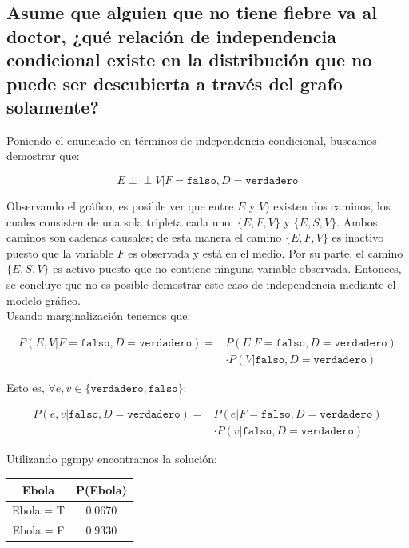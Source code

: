 \documentclass[letterpaper,12pt]{article}
\theoremstyle{definition}
\begin{document}
\subsection*{Asume que alguien que no tiene fiebre va al doctor, ¿qué relación de independencia condicional existe en la distribución que no puede ser descubierta a través del grafo solamente?}

Poniendo el enunciado en términos de independencia condicional, buscamos demostrar que:

\begin{equation}
E \perp\!\!\!\perp V | F = \texttt{falso}, D = \texttt{verdadero}
\end{equation}

Observando el gráfico, es posible ver que entre \(E\) y \(V\)) existen dos caminos, los cuales consisten de una sola tripleta cada uno: \(\{E,F,V\}\) y  \(\{E,S,V\}\). Ambos caminos son cadenas causales; de esta manera el camino \(\{E,F,V\}\) es inactivo puesto que la variable \(F\) es observada y está en el medio. Por su parte, el camino  \(\{E,S,V\}\) es activo puesto que no contiene ninguna variable observada. Entonces, se concluye que no es posible demostrar este caso de independencia mediante el modelo gráfico. \\

Usando marginalización tenemos que: 

\begin{align*}
P(E,V | F = \texttt{falso},D = \texttt{verdadero}) = & P(E|F = \texttt{falso},D = \texttt{verdadero}) \\
                             & \cdot P(V|\texttt{falso},D = \texttt{verdadero})
\end{align*}

Esto es, \(\forall e,v \in \{\texttt{verdadero},\texttt{falso}\}\):

\begin{align*}
P(e,v|\texttt{falso},D = \texttt{verdadero}) = & P(e|F = \texttt{falso},D = \texttt{verdadero}) \\
&  \cdot P(v|\texttt{falso},D = \texttt{verdadero})
\end{align*}


Utilizando pgmpy encontramos la solución:\\

\begin{table}[H]
	\centering
	\begin{tabular}{|c|c|}
		\toprule
		Ebola & P(Ebola) \\
		\midrule
		Ebola = T & 0.0670 \\
		Ebola = F & 0.9330  \\
		\bottomrule
	\end{tabular}
\end{table}
\end{document}
